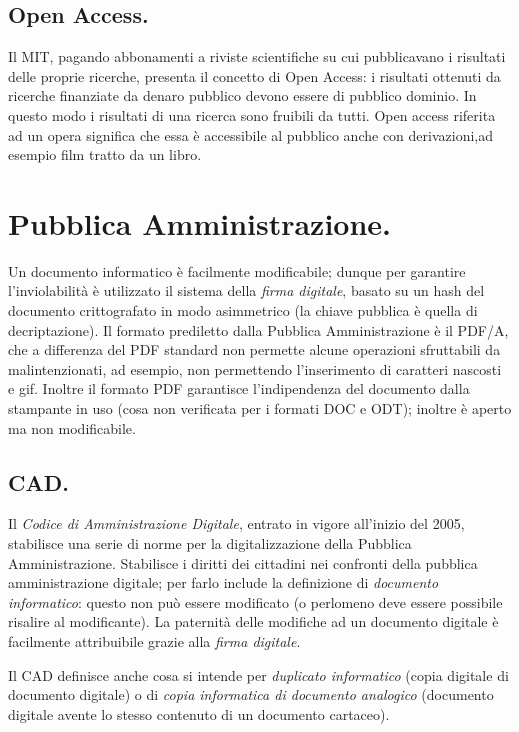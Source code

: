 \documentclass[a4page, 11pt, twocolumn]{article}
\begin{document}
\subsection{Open Access.}
Il MIT, pagando abbonamenti a riviste scientifiche su cui pubblicavano i risultati delle proprie ricerche, presenta il concetto di Open Access: i risultati ottenuti da ricerche finanziate da denaro pubblico devono essere di pubblico dominio.
In questo modo i risultati di una ricerca sono fruibili da tutti.
Open access riferita ad un opera significa che essa è accessibile al pubblico anche con derivazioni,ad esempio film tratto da un libro.

\section{Pubblica Amministrazione.}
Un documento informatico è facilmente modificabile; dunque per garantire l'inviolabilità è utilizzato il sistema della \textit{firma digitale}, basato su un hash del documento crittografato in modo asimmetrico (la chiave pubblica è quella di decriptazione).
Il formato prediletto dalla Pubblica Amministrazione è il PDF/A, che a differenza del PDF standard non permette alcune operazioni sfruttabili da malintenzionati, ad esempio, non permettendo l'inserimento di caratteri nascosti e gif.
Inoltre il formato PDF garantisce l'indipendenza del documento dalla stampante in uso (cosa non verificata per i formati DOC e ODT); inoltre è aperto ma non modificabile.

\subsection{CAD.}
Il \textit{Codice di Amministrazione Digitale}, entrato in vigore all'inizio del 2005, stabilisce una serie di norme per la digitalizzazione della Pubblica Amministrazione.
Stabilisce i diritti dei cittadini nei confronti della pubblica amministrazione digitale; per farlo include la definizione di \textit{documento informatico}: questo non può essere modificato (o perlomeno deve essere possibile risalire al modificante).
La paternità delle modifiche ad un documento digitale è facilmente attribuibile grazie alla \textit{firma digitale}.

Il CAD definisce anche cosa si intende per \textit{duplicato informatico} (copia digitale di documento digitale) o di \textit{copia informatica di documento analogico} (documento digitale avente lo stesso contenuto di un documento cartaceo).
\end{document}
